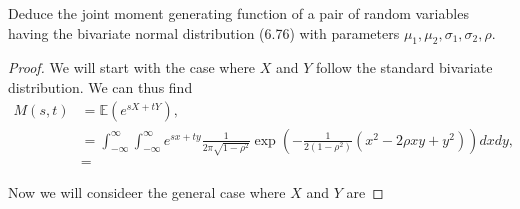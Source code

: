 \documentclass{article}
\newcommand{\E}[1]{\mathbb{E}(#1)}
\begin{document}
Deduce the joint moment generating function of a pair of random variables
having the bivariate normal distribution (6.76) with parameters
$\mu_1, \mu_2, \sigma_1, \sigma_2, \rho$.

\begin{proof}
    We will start with the case where $X$ and $Y$ follow the standard bivariate
    distribution. We can thus find
    \begin{align*}
        M(s,t) & = \E{e^{sX + tY}},                                       \\
               & = \int_{-\infty}^\infty\int_{-\infty}^\infty e^{sx+ty}
        \frac{1}{2\pi\sqrt{1 - \rho^2}}
        \exp\left(-\frac{1}{2(1-\rho^2)}(x^2-2\rho xy + y^2)\right) dxdy, \\
               & =
    \end{align*}

    Now we will consideer the general case where $X$ and $Y$ are
\end{proof}
\end{document}
